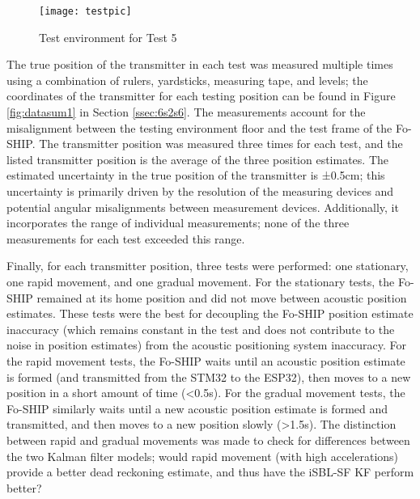 \documentclass[11pt]{ucthesisCP}
\begin{document}
\begin{figure}[htbp]
	\centering
	\texttt{[image: testpic]}
	\caption{Test environment for Test 5}
	\label{fig:testpic}
\end{figure}

The true position of the transmitter in each test was measured multiple times using a combination of rulers, yardsticks, measuring tape, and levels; the coordinates of the transmitter for each testing position can be found in Figure \ref{fig:datasum1} in Section \ref{ssec:6s2s6}. The measurements account for the misalignment between the testing environment floor and the test frame of the Fo-SHIP. The transmitter position was measured three times for each test, and the listed transmitter position is the average of the three position estimates. The estimated uncertainty in the true position of the transmitter is ±0.5cm; this uncertainty is primarily driven by the resolution of the measuring devices and potential angular misalignments between measurement devices. Additionally, it incorporates the range of individual measurements; none of the three measurements for each test exceeded this range.

Finally, for each transmitter position, three tests were performed: one stationary, one rapid movement, and one gradual movement. For the stationary tests, the Fo-SHIP remained at its home position and did not move between acoustic position estimates. These tests were the best for decoupling the Fo-SHIP position estimate inaccuracy (which remains constant in the test and does not contribute to the noise in position estimates) from the acoustic positioning system inaccuracy. For the rapid movement tests, the Fo-SHIP waits until an acoustic position estimate is formed (and transmitted from the STM32 to the ESP32), then moves to a new position in a short amount of time (\textless0.5s). For the gradual movement tests, the Fo-SHIP similarly waits until a new acoustic position estimate is formed and transmitted, and then moves to a new position slowly (\textgreater1.5s). The distinction between rapid and gradual movements was made to check for differences between the two Kalman filter models; would rapid movement (with high accelerations) provide a better dead reckoning estimate, and thus have the iSBL-SF KF perform better?
\end{document}
